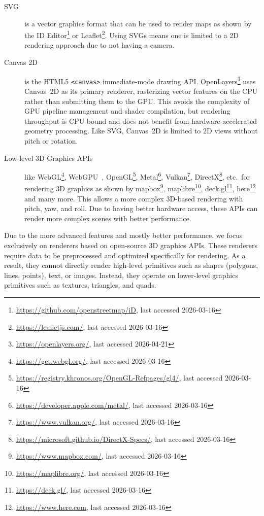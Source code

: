 \begin{description}
\item[\ac{SVG}] \begin{sloppypar} is a vector graphics format that can be used to render maps as shown by the ID Editor\footnote{\url{https://github.com/openstreetmap/iD}, last accessed 2026-03-16} or Leaflet\footnote{\url{https://leafletjs.com/}, last accessed 2026-03-16}.
Using \acp{SVG} means one is limited to a 2D rendering approach due to not having a camera.\end{sloppypar}

\item[Canvas 2D] is the HTML5 \texttt{<canvas>} immediate-mode drawing \ac{API}.
OpenLayers\footnote{\url{https://openlayers.org/}, last accessed 2026-04-21} uses Canvas~2D as its primary renderer, rasterizing vector features on the \ac{CPU} rather than submitting them to the \ac{GPU}.
This avoids the complexity of \ac{GPU} pipeline management and shader compilation, but rendering throughput is \ac{CPU}-bound and does not benefit from hardware-accelerated geometry processing.
Like \ac{SVG}, Canvas~2D is limited to 2D views without pitch or rotation.

\item[Low-level 3D Graphics \acp{API}] \begin{sloppypar} like \ac{WebGL}\footnote{\url{https://get.webgl.org/}, last accessed 2026-03-16}, \ac{WebGPU}~\cite{WebGPU}, OpenGL\footnote{\url{https://registry.khronos.org/OpenGL-Refpages/gl4/}, last accessed 2026-03-16}, Metal\footnote{\url{https://developer.apple.com/metal/}, last accessed 2026-03-16}, Vulkan\footnote{\url{https://www.vulkan.org/}, last accessed 2026-03-16}, DirectX\footnote{\url{https://microsoft.github.io/DirectX-Specs/}, last accessed 2026-03-16}, etc.\ for rendering 3D graphics as shown by mapbox\footnote{\url{https://www.mapbox.com/}, last accessed 2026-03-16}, maplibre\footnote{\url{https://maplibre.org/}, last accessed 2026-03-16}, deck.gl\footnote{\url{https://deck.gl/}, last accessed 2026-03-16}, here\footnote{\url{https://www.here.com}, last accessed 2026-03-16} and many more.
This allows a more complex 3D-based rendering with pitch, yaw, and roll.
Due to having better hardware access, these \acp{API} can render more complex scenes with better performance.\end{sloppypar}
\end{description}

Due to the more advanced features and mostly better performance, we focus exclusively on renderers based on open-source 3D graphics \acp{API}.
These renderers require data to be preprocessed and optimized specifically for rendering.
As a result, they cannot directly render high-level primitives such as shapes (polygons, lines, points), text, or images.
Instead, they operate on lower-level graphics primitives such as textures, triangles, and quads.

